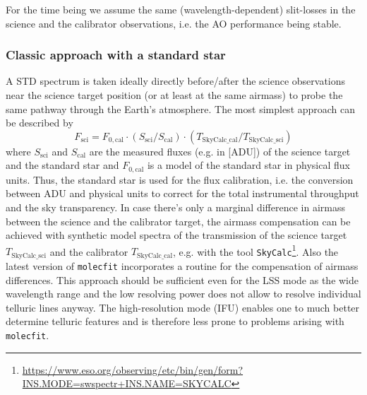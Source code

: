 For the time being we assume the same (wavelength-dependent) slit-losses in the science and the calibrator observations, i.e. the \ac{AO} performance being stable.  \\

\subsubsection{Classic approach with a standard star}\label{sssec:tecllcorrclassic}
A \ac{STD} spectrum is taken ideally directly before/after the science observations near the science target position (or at least at the same airmass) to probe the same pathway through the Earth's atmosphere. The most simplest approach can be described by
\begin{equation}
    F_\textrm{sci}=F_{0,\textrm{cal}}\cdot\left(S_\textrm{sci}/S_\textrm{cal}\right)\cdot\left(T_\textrm{SkyCalc\_cal} / T_\textrm{SkyCalc\_sci}\right)
\end{equation}
where $S_\textrm{sci}$ and $S_\textrm{cal}$ are the measured fluxes (e.g. in [\ac{ADU}]) of the science target and the standard star and $F_{0,\textrm{cal}}$ is a model of the standard star in physical flux units. Thus, the standard star is used for the flux calibration, i.e. the conversion between \ac{ADU} and physical units to correct for the total instrumental throughput and the sky transparency. In case there's only a marginal difference in airmass between the science and the calibrator target, the airmass compensation can be achieved with synthetic model spectra of the transmission of the science target $T_\textrm{SkyCalc\_sci}$ and the calibrator $T_\textrm{SkyCalc\_cal}$, e.g. with the tool \texttt{SkyCalc}\footnote{\url{https://www.eso.org/observing/etc/bin/gen/form?INS.MODE=swspectr+INS.NAME=SKYCALC}}. Also the latest version of \texttt{molecfit} incorporates a routine for the compensation of airmass differences. This approach should be sufficient even for the \ac{LSS} mode as the wide wavelength range and the low resolving power does not allow to resolve individual telluric lines anyway. The high-resolution mode (\ac{IFU}) enables one to much better determine telluric features and is therefore less prone to problems arising with \texttt{molecfit}.\\
